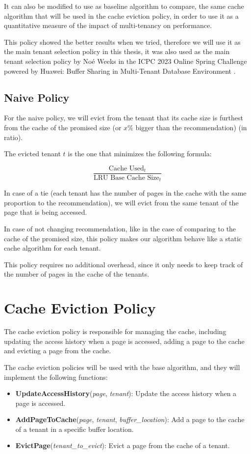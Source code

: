 It can also be modified to use as baseline algorithm to compare, the same cache algorithm
that will be used in the cache eviction policy, in order to use it as a quantitative measure
of the impact of multi-tenancy on performance.

This policy showed the better results when we tried, therefore we will use it as the main 
tenant selection policy in this thesis, it was also used as the main tenant selection policy
by Noé Weeks \cite{noe-weeks-comments} in the ICPC 2023 Online Spring Challenge powered by Huawei: Buffer Sharing in
Multi-Tenant Database Environment \cite{huawei-challenge}.

\subsection{Naive Policy}

For the naive policy, we will evict from the tenant that its cache size is furthest
from the cache of the promised size (or $x\%$ bigger than the recommendation) (in ratio).

The evicted tenant $t$ is the one that minimizes the following formula:

$$
\frac{ \text{Cache Used}_t }{ \text{LRU Base Cache Size}_t }
$$

In case of a tie (each tenant has the number of pages in the cache with the same 
proportion to the recommendation), we will evict from the same tenant of the page that 
is being accessed.


In case of not changing recommendation, like in the case of comparing to the cache of
the promised size, this policy makes our algorithm behave like a static cache algorithm
for each tenant.

This policy requires no additional overhead, since it only needs to keep track of the
number of pages in the cache of the tenants.

\section{Cache Eviction Policy}

The cache eviction policy is responsible for managing the cache, including updating the
access history when a page is accessed, adding a page to the cache and evicting a page
from the cache.

The cache eviction policies will be used with the base algorithm, and they will implement
the following functions:

\begin{itemize}
    \item \textbf{UpdateAccessHistory}(\textit{page}, \textit{tenant}): Update the access history when a page is accessed.
    \item \textbf{AddPageToCache}(\textit{page}, \textit{tenant}, \textit{buffer\_location}): Add a page to the cache of a tenant in a specific buffer location.
    \item \textbf{EvictPage}(\textit{tenant\_to\_evict}): Evict a page from the cache of a tenant.
\end{itemize}

